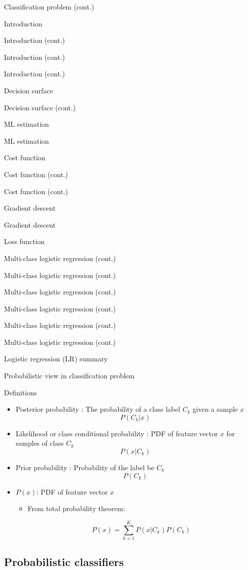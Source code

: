 \documentclass[serif, aspectratio=169]{beamer}
\begin{document}
\begin{frame}{Classification problem (cont.)}
\begin{itemize}
\begin{frame}{Introduction}
\begin{itemize}
\begin{frame}{Introduction (cont.)}
\begin{frame}{Introduction (cont.)}
\begin{frame}{Introduction (cont.)}
\begin{frame}{Decision surface}
\begin{itemize}
\begin{frame}{Decision surface (cont.)}
\begin{frame}{ML estimation}
\begin{frame}{ML estimation}
\begin{itemize}
\begin{frame}{Cost function}
\begin{frame}{Cost function (cont.)}
\begin{itemize}
\begin{itemize}
\begin{frame}{Cost function (cont.)}
\begin{frame}{Gradient descent}
\begin{frame}{Gradient descent}
\begin{frame}{Loss function}
\begin{frame}{Multi-class logistic regression (cont.)}
\begin{frame}{Multi-class logistic regression (cont.)}
\begin{frame}{Multi-class logistic regression (cont.)}
\begin{frame}{Multi-class logistic regression (cont.)}
\begin{frame}{Multi-class logistic regression (cont.)}
\begin{frame}{Multi-class logistic regression (cont.)}
\begin{frame}{Logistic regression (LR) summary}
\begin{itemize}
\begin{frame}{Probabilistic view in classification problem}
\begin{itemize}
    \end{itemize}
\end{frame}
\begin{frame}{Definitions}
    \begin{itemize}
        \item Posterior probability : The probability of a class label $C_k$ given a sample $x$
            \[
                P(C_k|x)
            \]
            
        \item Likelihood or class conditional probability : PDF of feature vector $x$ for samples of class $C_k$
            \[
                 P(x|C_k)
            \]
        
        \item Prior probability : Probability of the label be $C_k$ 
            \[
            P(C_k)
            \]
            
        \item $P(x)$: PDF of feature vector $x$ 
            \begin{itemize}
                \item From total probability theorem:   
                
                \[ P(x)=\sum_{k=1}^{K}P(x|C_k)P(C_k)
                \]
            \end{itemize}
        
    \end{itemize}
\end{frame}



\subsection{Probabilistic classifiers}


\end{itemize}
\end{frame}
\end{frame}
\end{frame}
\end{frame}
\end{frame}
\end{frame}
\end{frame}
\end{frame}
\end{frame}
\end{frame}
\end{frame}
\end{itemize}
\end{itemize}
\end{frame}
\end{frame}
\end{itemize}
\end{frame}
\end{frame}
\end{frame}
\end{itemize}
\end{frame}
\end{frame}
\end{frame}
\end{frame}
\end{itemize}
\end{frame}
\end{itemize}
\end{frame}
\end{document}
